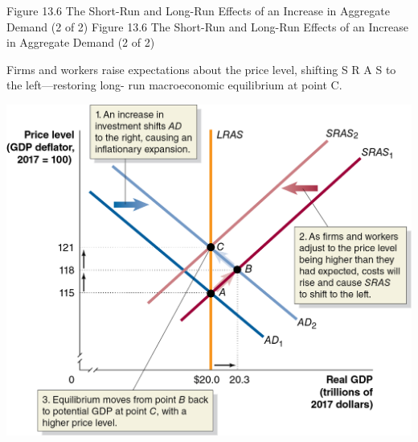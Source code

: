 \documentclass[
  12pt,
  ignorenonframetext,
]{beamer}
\begin{document}
\begin{frame}{Figure 13.6 The Short-Run and Long-Run Effects of an
Increase in Aggregate Demand (2 of 2)}
\protect\hypertarget{figure-13.6-the-short-run-and-long-run-effects-of-an-increase-in-aggregate-demand-2-of-2}{}
Figure 13.6 The Short-Run and Long-Run Effects of an Increase in
Aggregate Demand (2 of 2)

Firms and workers raise expectations about the price level, shifting S R
A S to the left---restoring long- run macroeconomic equilibrium at point
C.

\includegraphics[width=\textwidth,height=0.99\textheight]{imgs3/img_slide36a.png}
\end{frame}
\end{document}
